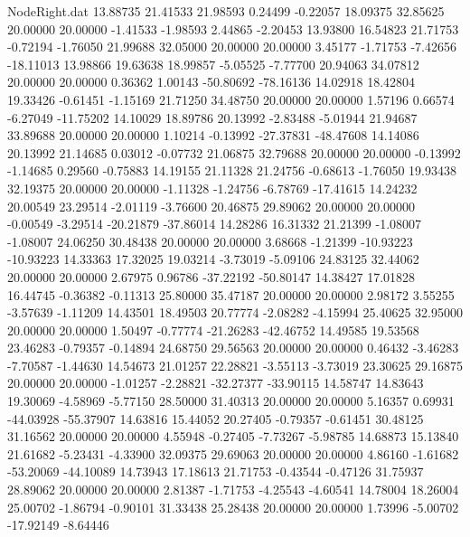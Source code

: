 \begin{filecontents}{NodeRight.dat}
  13.88735   21.41533   21.98593     0.24499   -0.22057   18.09375   32.85625   20.00000   20.00000   -1.41533   -1.98593    2.44865   -2.20453
  13.93800   16.54823   21.71753    -0.72194   -1.76050   21.99688   32.05000   20.00000   20.00000    3.45177   -1.71753   -7.42656  -18.11013
  13.98866   19.63638   18.99857    -5.05525   -7.77700   20.94063   34.07812   20.00000   20.00000    0.36362    1.00143  -50.80692  -78.16136
  14.02918   18.42804   19.33426    -0.61451   -1.15169   21.71250   34.48750   20.00000   20.00000    1.57196    0.66574   -6.27049  -11.75202
  14.10029   18.89786   20.13992    -2.83488   -5.01944   21.94687   33.89688   20.00000   20.00000    1.10214   -0.13992  -27.37831  -48.47608
  14.14086   20.13992   21.14685     0.03012   -0.07732   21.06875   32.79688   20.00000   20.00000   -0.13992   -1.14685    0.29560   -0.75883
  14.19155   21.11328   21.24756    -0.68613   -1.76050   19.93438   32.19375   20.00000   20.00000   -1.11328   -1.24756   -6.78769  -17.41615
  14.24232   20.00549   23.29514    -2.01119   -3.76600   20.46875   29.89062   20.00000   20.00000   -0.00549   -3.29514  -20.21879  -37.86014
  14.28286   16.31332   21.21399    -1.08007   -1.08007   24.06250   30.48438   20.00000   20.00000    3.68668   -1.21399  -10.93223  -10.93223
  14.33363   17.32025   19.03214    -3.73019   -5.09106   24.83125   32.44062   20.00000   20.00000    2.67975    0.96786  -37.22192  -50.80147
  14.38427   17.01828   16.44745    -0.36382   -0.11313   25.80000   35.47187   20.00000   20.00000    2.98172    3.55255   -3.57639   -1.11209
  14.43501   18.49503   20.77774    -2.08282   -4.15994   25.40625   32.95000   20.00000   20.00000    1.50497   -0.77774  -21.26283  -42.46752
  14.49585   19.53568   23.46283    -0.79357   -0.14894   24.68750   29.56563   20.00000   20.00000    0.46432   -3.46283   -7.70587   -1.44630
  14.54673   21.01257   22.28821    -3.55113   -3.73019   23.30625   29.16875   20.00000   20.00000   -1.01257   -2.28821  -32.27377  -33.90115
  14.58747   14.83643   19.30069    -4.58969   -5.77150   28.50000   31.40313   20.00000   20.00000    5.16357    0.69931  -44.03928  -55.37907
  14.63816   15.44052   20.27405    -0.79357   -0.61451   30.48125   31.16562   20.00000   20.00000    4.55948   -0.27405   -7.73267   -5.98785
  14.68873   15.13840   21.61682    -5.23431   -4.33900   32.09375   29.69063   20.00000   20.00000    4.86160   -1.61682  -53.20069  -44.10089
  14.73943   17.18613   21.71753    -0.43544   -0.47126   31.75937   28.89062   20.00000   20.00000    2.81387   -1.71753   -4.25543   -4.60541
  14.78004   18.26004   25.00702    -1.86794   -0.90101   31.33438   25.28438   20.00000   20.00000    1.73996   -5.00702  -17.92149   -8.64446

\end{filecontents}
